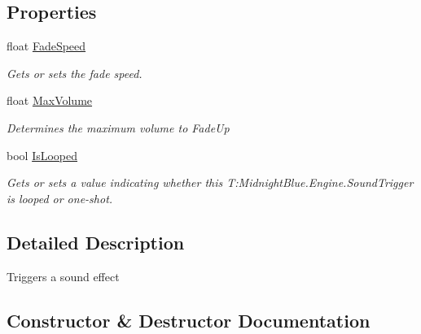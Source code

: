 \subsection*{Properties}
\begin{DoxyCompactItemize}
\item 
float \hyperlink{class_midnight_blue_1_1_engine_1_1_sound_trigger_a021b23bde55f005a31e4b55080deca65}{Fade\+Speed}
\begin{DoxyCompactList}\small\item\em Gets or sets the fade speed. \end{DoxyCompactList}\item 
float \hyperlink{class_midnight_blue_1_1_engine_1_1_sound_trigger_a06ed16768f70795a6b89e94deb89835b}{Max\+Volume}
\begin{DoxyCompactList}\small\item\em Determines the maximum volume to Fade\+Up \end{DoxyCompactList}\item 
bool \hyperlink{class_midnight_blue_1_1_engine_1_1_sound_trigger_afbbf5dade4ec346ee419b00083b540b7}{Is\+Looped}
\begin{DoxyCompactList}\small\item\em Gets or sets a value indicating whether this T\+:\+Midnight\+Blue.\+Engine.\+Sound\+Trigger is looped or one-\/shot. \end{DoxyCompactList}\end{DoxyCompactItemize}


\subsection{Detailed Description}
Triggers a sound effect 



\subsection{Constructor \& Destructor Documentation}
\hypertarget{class_midnight_blue_1_1_engine_1_1_sound_trigger_add2bdff21e821e0cd29471ae5b2f6552}{}\label{class_midnight_blue_1_1_engine_1_1_sound_trigger_add2bdff21e821e0cd29471ae5b2f6552} 
